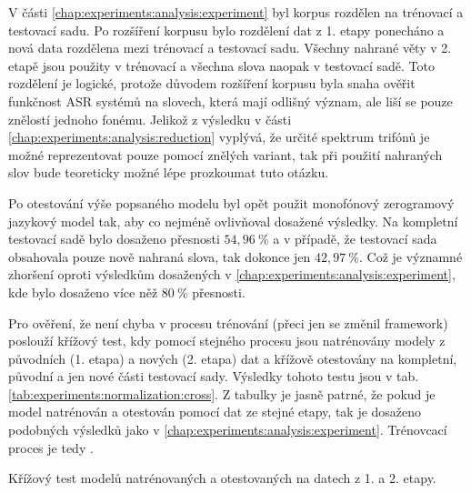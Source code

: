 V části \ref{chap:experiments:analysis:experiment} byl korpus rozdělen na trénovací a testovací sadu. Po rozšíření korpusu bylo rozdělení dat z 1. etapy ponecháno a nová data rozdělena mezi trénovací a testovací sadu. Všechny nahrané věty v 2. etapě jsou použity v trénovací a všechna slova naopak v testovací sadě. Toto rozdělení je logické, protože důvodem rozšíření korpusu byla snaha ověřit funkčnost ASR systémů na slovech, která mají odlišný význam, ale liší se pouze znělostí jednoho fonému. Jelikož z výsledku v části \ref{chap:experiments:analysis:reduction} vyplývá, že určité spektrum trifónů je možné reprezentovat pouze pomocí znělých variant, tak při použití nahraných slov bude teoreticky možné lépe prozkoumat tuto otázku.

Po otestování výše popsaného modelu byl opět použit monofónový zerogramový jazykový model tak, aby co nejméně ovlivňoval dosažené výsledky. Na kompletní testovací sadě bylo dosaženo přesnosti $54,96\ \%$ a v případě, že testovací sada obsahovala pouze nově nahraná slova, tak dokonce jen $42,97\ \%$. Což je významné zhoršení oproti výsledkům dosažených v \ref{chap:experiments:analysis:experiment}, kde bylo dosaženo více něž $80\ \%$ přesnosti.

Pro ověření, že není chyba v procesu trénování (přeci jen se změnil framework) poslouží křížový test, kdy pomocí stejného procesu jsou natrénovány modely z původních (1. etapa) a nových (2. etapa) dat a křížově otestovány na kompletní, původní a jen nové části testovací sady. Výsledky tohoto testu jsou v tab. \ref{tab:experiments:normalization:cross}. Z tabulky je jasně patrné, že pokud je model natrénován a otestován pomocí dat ze stejné etapy, tak je dosaženo podobných výsledků jako v \ref{chap:experiments:analysis:experiment}. Trénovcací proces je tedy .


\begin{table}[htpb]
  \centering
  \def\arraystretch{1.5}
  \caption{Křížový test modelů natrénovaných a otestovaných na datech z 1. a 2. etapy.}
  \label{tab:experiments:normalization:cross}
\end{table}

